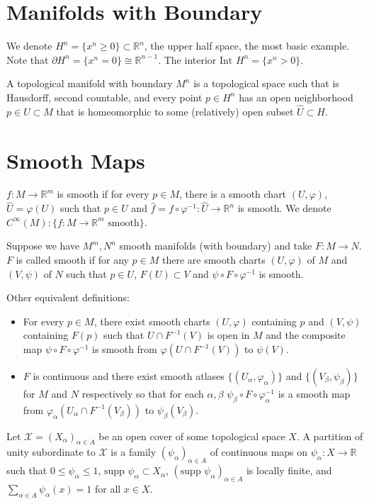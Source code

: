 \documentclass[12pt]{scrartcl}
\newcommand{\R}{\mathbb{R}}
\renewcommand{\hat}{\widehat}
\let \phi \varphi
\let \mc \mathcal
\newcommand{\supp}{\text{supp }}
\begin{document}
\section{Manifolds with Boundary}
\begin{definition}We denote $H^n = \{x^n \ge 0\} \subset \R^n$, the upper half space, the most basic example.  Note that $\partial H^n = \{x^n = 0\} \cong \R^{n-1}$.  The interior $\text{Int }H^n = \{x^n > 0\}$.  
\end{definition}
\begin{definition} A topological manifold with boundary $M^n$ is a topological space such that is Hausdorff,
 second countable, and every point $p \in H^n$ has an open neighborhood $p \in U \subset M$ that is
  homeomorphic to some (relatively) open subset $\hat{U} \subset H$.
\end{definition}


\section{Smooth Maps}
\begin{definition} $f: M \to \R^m$ is smooth if for every $p \in M$, there is a smooth chart $(U, \phi)$, $\hat{U} = \phi(U)$ such that $p \in U$ and $\hat{f} = f \circ \phi^{-1}: \hat{U} \to \R^n$ is smooth. We denote $C^\infty(M) : \{f: M \to \R^m \text{ smooth}\}$.
\end{definition}

\begin{definition} Suppose we have $M^m, N^n$ smooth manifolds (with boundary) and take $F: M \to N$.
$F$ is called smooth if for any $p \in M$ there are smooth charts $(U, \phi)$ of $M$ and $(V, \psi)$ of $N$ such that $p\in U$, $F(U) \subset V$ and $\psi \circ F \circ \phi^{-1}$ is smooth.
\end{definition}
Other equivalent definitions:
\begin{itemize}
\item For every $p \in M$, there exist smooth charts $(U, \phi)$ containing $p$ and $(V, \psi)$ containing $F(p)$ such that $U \cap F^{-1}(V)$ is open in $M$ and the composite map $\psi \circ F \circ \phi^{-1}$ is smooth from $\phi(U \cap F^{-1}(V))$ to $\psi(V)$.
\item $F$ is continuous and there exist smooth atlases $\{(U_\alpha, \phi_\alpha)\}$ and $\{(V_\beta, \psi_\beta)\}$ for $M$ and $N$ respectively so that for each $\alpha, \beta$ $\psi_\beta \circ F \circ \phi_\alpha^{-1}$ is a smooth map from $\phi_\alpha(U_\alpha \cap F^{-1}(V_\beta))$ to $\psi_\beta(V_\beta)$.
\end{itemize}
\begin{definition} Let $\mc X = (X_\alpha)_{\alpha \in A}$ be an open cover of some topological space $X$.  A partition of unity subordinate to $\mc X$ is a family $(\psi_\alpha)_{\alpha \in A}$ of continuous maps on $\psi_\alpha: X \to \R$ such that $0 \le \psi_\alpha \le 1$, $\supp \psi_\alpha \subset X_\alpha$, $(\supp \psi_\alpha)_{\alpha \in A}$ is locally finite, and $\sum_{\alpha \in A} \psi_\alpha(x) = 1$ for all $x \in X$.
\end{definition}
\end{document}
